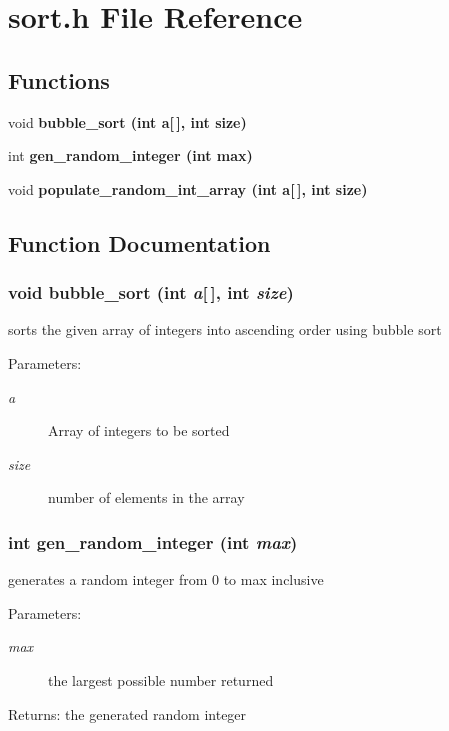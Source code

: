 \section{sort.h File Reference}
\label{sort_8h}
\subsection*{Functions}
\begin{CompactItemize}
\item 
void \bf{bubble\_\-sort} (int a[$\,$], int size)
\item 
int \bf{gen\_\-random\_\-integer} (int max)
\item 
void \bf{populate\_\-random\_\-int\_\-array} (int a[$\,$], int size)
\end{CompactItemize}


\subsection{Function Documentation}
\subsubsection{\setlength{\rightskip}{0pt plus 5cm}void bubble\_\-sort (int {\em a}[$\,$], int {\em size})}\label{sort_8h_c715f97e1353ec804edd8cbda7dcd1a1}


sorts the given array of integers into ascending order using bubble sort \begin{Desc}
\item[Parameters:]
\begin{description}
\item[{\em a}]Array of integers to be sorted \item[{\em size}]number of elements in the array \end{description}
\end{Desc}
\subsubsection{\setlength{\rightskip}{0pt plus 5cm}int gen\_\-random\_\-integer (int {\em max})}\label{sort_8h_622b7a4e3e97d78fa153b5df9d88b4d6}


generates a random integer from 0 to max inclusive \begin{Desc}
\item[Parameters:]
\begin{description}
\item[{\em max}]the largest possible number returned \end{description}
\end{Desc}
\begin{Desc}
\item[Returns:]the generated random integer \end{Desc}
